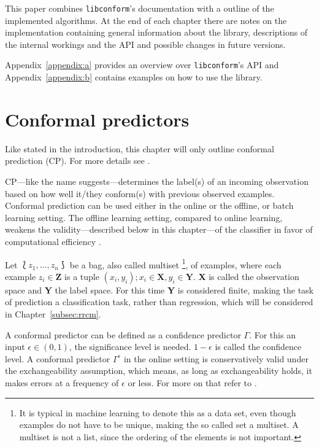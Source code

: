 \documentclass[twoside,11pt]{article}
\def\libconform{\texttt{libconform}}
\begin{document}
This paper combines \libconform{}'s documentation with a
outline of the implemented algorithms.
At the end of each chapter there are notes on the
implementation containing general information about the
library, descriptions of the internal workings and the API
and possible changes in future versions.

Appendix~\ref{appendix:a} provides an overview over
\libconform's API and Appendix~\ref{appendix:b} contains
examples on how to use the library.

\section{Conformal predictors}

Like stated in the introduction, this chapter will only
outline conformal prediction (CP). For more details see
\citet{alrw}.

CP---like the name suggests---determines the label(s) of an
incoming observation based on how well it/they conform(s)
with previous observed examples. Conformal prediction can
be used either in the online or the offline, or batch
learning setting.
The offline learning setting, compared to online learning,
weakens the validity---described below in this chapter---of
the classifier in favor of computational efficiency
\citep[see][Chapter 3]{alrw}.

Let $\Lbag z_1,\dots,z_n \Rbag$ be a bag, also called
multiset%
\footnote{It is typical in machine learning to denote this
as a data set, even though examples do not have to
be unique, making the so called set a multiset. A multiset
is not a list, since the ordering of the elements is not
important.},
of examples, where each example $z_i \in \textbf{Z}$ is a
tuple $(x_i,y_i); x_i \in \textbf{X}, y_i \in \textbf{Y}$.
\textbf{X} is called the observation space and \textbf{Y}
the label space. For this time \textbf{Y} is considered
finite, making the task of prediction a classification
task, rather than regression, which will be considered in
Chapter~\ref{subsec:rrcm}.

A conformal predictor can be defined as a confidence
predictor $\Gamma$. For this an input $\epsilon \in (0,1)$,
the significance level is needed. $1 - \epsilon$ is called
the confidence level.
A conformal predictor $\Gamma^\epsilon$ in the online
setting is conservatively valid under the exchangeability
assumption, which means, as long as exchangeability holds,
it makes errors at a frequency of $\epsilon$ or less. For
more on that refer to \citet[][Chapters 1,2,7]{alrw}.
\end{document}
